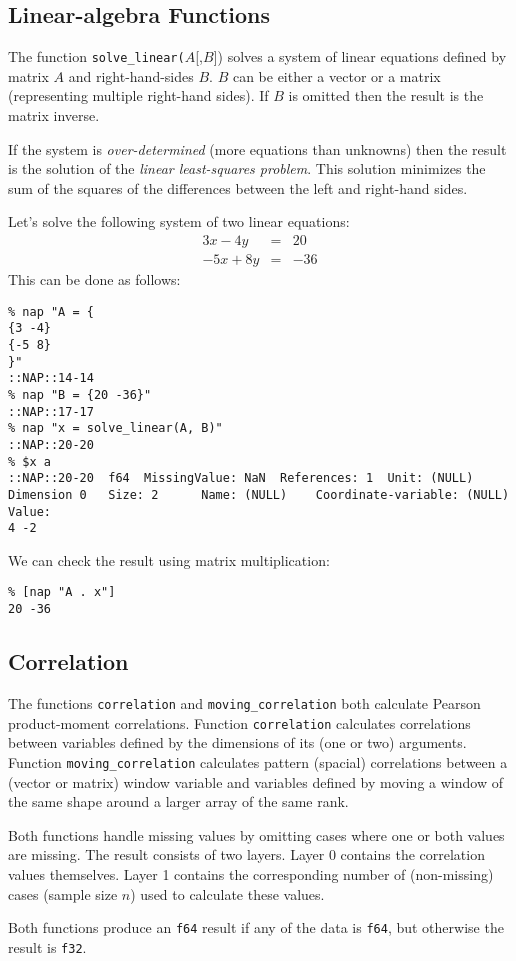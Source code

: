 \subsection{Linear-algebra Functions}
    \label{function-Linear-algebra}

The function 
\texttt{solve\_linear(}$A$[,$B$])
solves a system of linear equations defined by matrix $A$ and right-hand-sides $B$. 
$B$ can be either a vector or a matrix (representing multiple right-hand sides).
If $B$ is omitted then the result is the matrix inverse.

If the system is \textit{over-determined} (more equations than unknowns) then the
result is the solution of the \textit{linear least-squares problem}.
This solution minimizes the sum of the squares of the differences between the left and right-hand
sides.

Let's solve the following system of two linear equations:
\begin{eqnarray*}
3 x - 4 y & = & 20 \\
-5 x + 8 y & = & -36
\end{eqnarray*}
This can be done as follows:
\begin{verbatim}
% nap "A = {
{3 -4}
{-5 8}
}"
::NAP::14-14
% nap "B = {20 -36}"
::NAP::17-17
% nap "x = solve_linear(A, B)"
::NAP::20-20
% $x a
::NAP::20-20  f64  MissingValue: NaN  References: 1  Unit: (NULL)
Dimension 0   Size: 2      Name: (NULL)    Coordinate-variable: (NULL)
Value:
4 -2
\end{verbatim}

  \par We can check the result using matrix multiplication:
  \begin{verbatim}
% [nap "A . x"]
20 -36
\end{verbatim}

\subsection{Correlation}
    \label{function-Correlation}

  \par The functions 
  \texttt{correlation} and 
  \texttt{moving\_correlation} both calculate Pearson product-moment
  correlations. Function 
  \texttt{correlation} calculates correlations between variables
  defined by the dimensions of its (one or two) arguments. Function 
  \texttt{moving\_correlation} calculates pattern (spacial)
  correlations between a (vector or matrix) window variable and
  variables defined by moving a window of the same shape around a
  larger array of the same rank.
  \par Both functions handle missing values by omitting cases where one
  or both values are missing. The result consists of two layers. Layer
  0 contains the correlation values themselves. Layer 1 contains the
  corresponding number of (non-missing) cases (sample size 
  $n$) used to calculate these values.
  \par Both functions produce an 
  \texttt{f64} result if any of the data is 
  \texttt{f64}, but otherwise the result is 
  \texttt{f32}.

